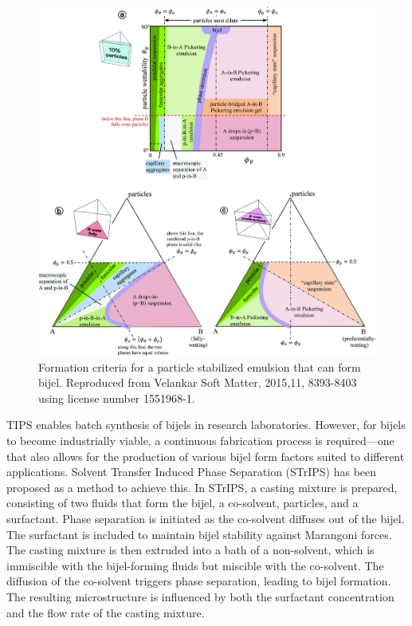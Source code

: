 \begin{figure}
    \centering
    \includegraphics[scale = 0.2]{figures/literature_review/state_diagram.jpg}
    \caption{Formation criteria for a particle stabilized emulsion that can form bijel. \cite{velankar_non-equilibrium_2015}
            Reproduced from Velankar Soft Matter, 2015,11, 8393-8403 using license number 1551968-1.}
    \label{fig:state_diagram_particle_emulsions}
\end{figure}

TIPS enables batch synthesis of bijels in research laboratories. However, for bijels to become industrially viable, a continuous fabrication process is required—one 
that also allows for the production of various bijel form factors suited to different applications. Solvent Transfer Induced Phase Separation (STrIPS) has been proposed 
as a method to achieve this. In STrIPS, a casting mixture is prepared, consisting of two fluids that form the bijel, a co-solvent, particles, and a surfactant. Phase 
separation is initiated as the co-solvent diffuses out of the bijel. The surfactant is included to maintain bijel stability against Marangoni forces. The casting mixture 
is then extruded into a bath of a non-solvent, which is immiscible with the bijel-forming fluids but miscible with the co-solvent. The diffusion of the co-solvent triggers 
phase separation, leading to bijel formation. The resulting microstructure is influenced by both the surfactant concentration and the flow rate of the casting mixture.

